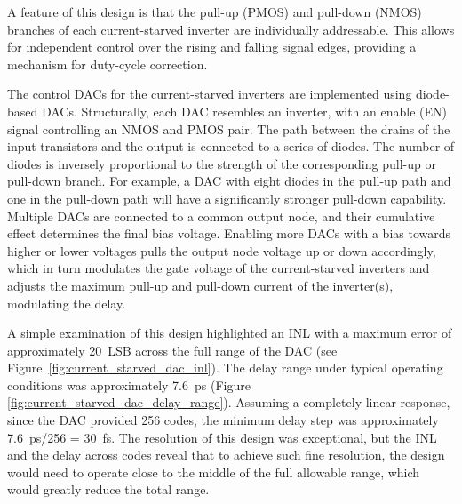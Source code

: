 A feature of this design is that the pull-up (PMOS) and pull-down (NMOS) branches of each current-starved inverter are individually addressable. This allows for independent control over the rising and falling signal edges, providing a mechanism for duty-cycle correction.

The control DACs for the current-starved inverters are implemented using diode-based DACs. Structurally, each DAC resembles an inverter, with an enable (EN) signal controlling an NMOS and PMOS pair. The path between the drains of the input transistors and the output is connected to a series of diodes. The number of diodes is inversely proportional to the strength of the corresponding pull-up or pull-down branch. For example, a DAC with eight diodes in the pull-up path and one in the pull-down path will have a significantly stronger pull-down capability. Multiple DACs are connected to a common output node, and their cumulative effect determines the final bias voltage. Enabling more DACs with a bias towards higher or lower voltages pulls the output node voltage up or down accordingly, which in turn modulates the gate voltage of the current-starved inverters and adjusts the maximum pull-up and pull-down current of the inverter(s), modulating the delay.

A simple examination of this design highlighted an INL with a maximum error of approximately 20~LSB across the full range of the DAC (see Figure~\ref{fig:current_starved_dac_inl}). The delay range under typical operating conditions was approximately 7.6~ps (Figure \ref{fig:current_starved_dac_delay_range}). Assuming a completely linear response, since the DAC provided 256 codes, the minimum delay step was approximately 7.6~ps/256 = 30~fs. The resolution of this design was exceptional, but the INL and the delay across codes reveal that to achieve such fine resolution, the design would need to operate close to the middle of the full allowable range, which would greatly reduce the total range.

